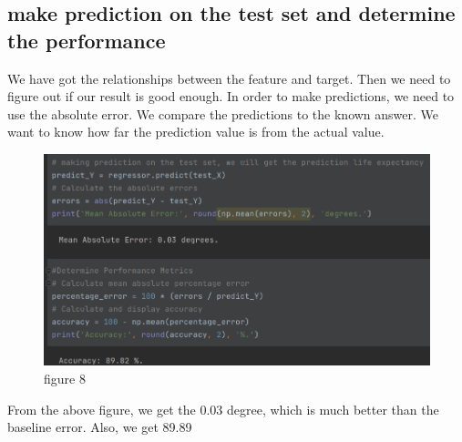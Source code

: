 \documentclass{article}
\begin{document}
\subsection{make prediction on the test set and determine the performance}
We have got the relationships between the feature and target. Then we need to figure out if our result is good enough. In order to make predictions, we need to use the absolute error. We compare the predictions to the known answer. We want to know how far the prediction value is from the actual value. 
\begin{figure}[H]
    \centering
    \includegraphics[width = 0.9\linewidth]{8.png}
    \caption{figure 8}
\end{figure}
From the above figure, we get the 0.03 degree, which is much better than the baseline error. Also, we get  89.89%
\end{document}
